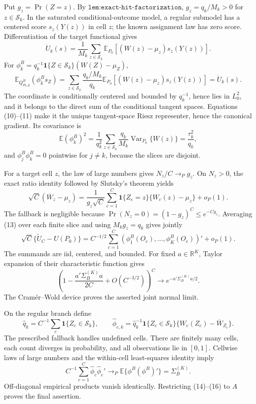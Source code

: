 Put \(g_z=\Pr(Z=z)\).  By \(\texttt{lem:exact-hit-factorization}\), \(g_z=q_k/M_k>0\) for \(z\in\mathcal S_k\).  In the saturated conditional-outcome model, a regular submodel has a centered score \(s_z(Y(z))\) in cell \(z\); the known assignment law has zero score.  Differentiation of the target functional gives
\[
 \dot U_k(s)=\frac1{M_k}\sum_{z\in\mathcal S_k}
 \mathbb E_{P_0}\!\left[(W(z)-\mu_z)s_z(Y(z))\right]. \tag{10}
\]
For \(\phi_k^B=q_k^{-1}\mathbf1\{Z\in\mathcal S_k\}(W(Z)-\mu_Z)\),
\[
 \mathbb E_{Q^B_{P_0,p}}(\phi_k^Bs_Z)
 =\sum_{z\in\mathcal S_k}\frac{q_k/M_k}{q_k}
 \mathbb E_{P_0}\!\left[(W(z)-\mu_z)s_z(Y(z))\right]
 =\dot U_k(s). \tag{11}
\]
The coordinate is conditionally centered and bounded by \(q_k^{-1}\), hence lies in \(L_0^2\), and it belongs to the direct sum of the conditional tangent spaces.  Equations (10)--(11) make it the unique tangent-space Riesz representer, hence the canonical gradient.  Its covariance is
\[
 \mathbb E(\phi_k^B)^2
 =\frac1{q_k^2}\sum_{z\in\mathcal S_k}\frac{q_k}{M_k}
 \operatorname{Var}_{P_0}\{W(z)\}=\frac{\tau_k^2}{q_k}, \tag{12}
\]
and \(\phi_j^B\phi_k^B=0\) pointwise for \(j\ne k\), because the slices are disjoint.

For a target cell \(z\), the law of large numbers gives \(N_z/C\to_Pg_z\).  On \(N_z>0\), the exact ratio identity followed by Slutsky's theorem yields
\[
 \sqrt C(\overline W_z-\mu_z)
 =\frac1{g_z\sqrt C}\sum_{c=1}^C\mathbf1\{Z_c=z\}
   \{W_c(z)-\mu_z\}+o_P(1). \tag{13}
\]
The fallback is negligible because \(\Pr(N_z=0)=(1-g_z)^C\leq e^{-Cg_z}\).  Averaging (13) over each finite slice and using \(M_kg_z=q_k\) gives jointly
\[
 \sqrt C\{\widetilde U_C-U(P_0)\}
 =C^{-1/2}\sum_{c=1}^C(\phi_1^B(O_c),\ldots,\phi_K^B(O_c))'+o_P(1). \tag{14}
\]
The summands are iid, centered, and bounded.  For fixed \(a\in\mathbb R^K\), Taylor expansion of their characteristic function gives
\[
 \left(1-\frac{a'\Sigma_B^{(K)}a}{2C}+O(C^{-3/2})\right)^C
 \longrightarrow e^{-a'\Sigma_B^{(K)}a/2}. \tag{15}
\]
The Cram\'er--Wold device proves the asserted joint normal limit.

On the regular branch define
\[
 \widehat q_k=C^{-1}\sum_c\mathbf1\{Z_c\in\mathcal S_k\},\qquad
 \widehat\phi_{c,k}=\widehat q_k^{-1}\mathbf1\{Z_c\in\mathcal S_k\}
 \{W_c(Z_c)-\overline W_{Z_c}\}.
\]
The prescribed fallback handles undefined cells.  There are finitely many cells, each count diverges in probability, and all observations lie in \([0,1]\).  Cellwise laws of large numbers and the within-cell least-squares identity imply
\[
 C^{-1}\sum_{c=1}^C\widehat\phi_c\widehat\phi_c'\to_P
 \mathbb E\{\phi^B(\phi^B)'\}=\Sigma_B^{(K)}. \tag{16}
\]
Off-diagonal empirical products vanish identically.  Restricting (14)--(16) to \(A\) proves the final assertion.